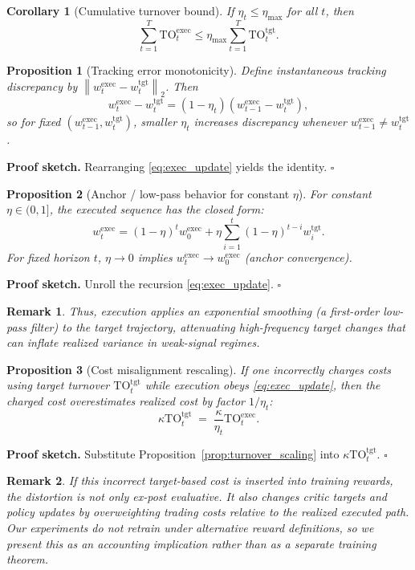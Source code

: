 \documentclass[10pt,twocolumn]{article}
\newtheorem{proposition}{Proposition}
\newtheorem{corollary}{Corollary}
\newtheorem{remark}{Remark}
\newcommand{\wexec}{w^{\mathrm{exec}}}
\newcommand{\wtgt}{w^{\mathrm{tgt}}}
\newcommand{\TOexec}{\mathrm{TO}^{\mathrm{exec}}}
\newcommand{\TOtgt}{\mathrm{TO}^{\mathrm{tgt}}}
\newcommand{\kappaTC}{\kappa}
\newcommand{\normtwo}[1]{\left\lVert #1 \right\rVert_2}
\begin{document}
\begin{corollary}[Cumulative turnover bound]\label{cor:cum_turnover}
If $\eta_t\le \eta_{\max}$ for all $t$, then
\[
\sum_{t=1}^T \TOexec_t \le \eta_{\max}\sum_{t=1}^T \TOtgt_t.
\]
\end{corollary}

\begin{proposition}[Tracking error monotonicity]\label{prop:tracking}
Define instantaneous tracking discrepancy by $\normtwo{\wexec_t-\wtgt_t}$. Then
\[
\wexec_t-\wtgt_t = (1-\eta_t)(\wexec_{t-1}-\wtgt_t),
\]
so for fixed $(\wexec_{t-1},\wtgt_t)$, smaller $\eta_t$ increases discrepancy whenever $\wexec_{t-1}\neq \wtgt_t$.
\end{proposition}
\noindent\textbf{Proof sketch.} Rearranging \eqref{eq:exec_update} yields the identity. \hfill$\square$

\begin{proposition}[Anchor / low-pass behavior for constant $\eta$]\label{prop:anchor}
For constant $\eta\in(0,1]$, the executed sequence has the closed form:
\[
\wexec_t = (1-\eta)^t \wexec_0 + \eta\sum_{i=1}^{t} (1-\eta)^{t-i}\wtgt_i.
\]
For fixed horizon $t$, $\eta\to0$ implies $\wexec_t\to \wexec_0$ (anchor convergence).
\end{proposition}
\noindent\textbf{Proof sketch.} Unroll the recursion \eqref{eq:exec_update}. \hfill$\square$
\begin{remark}
Thus, execution applies an exponential smoothing (a first-order low-pass filter) to the target trajectory, attenuating high-frequency target changes that can inflate realized variance in weak-signal regimes.
\end{remark}

\begin{proposition}[Cost misalignment rescaling]\label{prop:cost_misalignment}
If one incorrectly charges costs using target turnover $\TOtgt_t$ while execution obeys \eqref{eq:exec_update}, then the charged cost overestimates realized cost by factor $1/\eta_t$:
\[
\kappaTC \TOtgt_t \;=\; \frac{\kappaTC}{\eta_t}\TOexec_t.
\]
\end{proposition}
\noindent\textbf{Proof sketch.} Substitute Proposition~\ref{prop:turnover_scaling} into $\kappaTC\TOtgt_t$. \hfill$\square$
\begin{remark}
If this incorrect target-based cost is inserted into training rewards, the distortion is not only ex-post evaluative. It also changes critic targets and policy updates by overweighting trading costs relative to the realized executed path. Our experiments do not retrain under alternative reward definitions, so we present this as an accounting implication rather than as a separate training theorem.
\end{remark}
\end{document}
